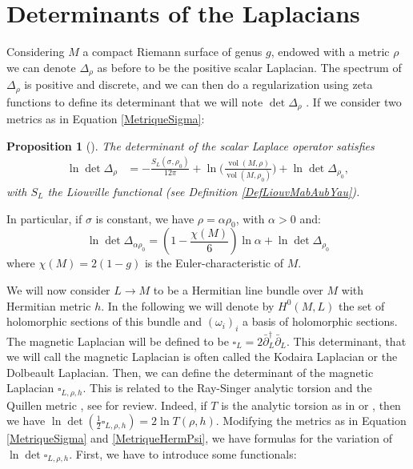 \documentclass{article}
\newtheorem{Proposition}[theorem]{Proposition}
\theoremstyle{definition}
\theoremstyle{remark}
\DeclareMathOperator{\vol}{vol}
\begin{document}
\section{Determinants of the Laplacians}\label{SectionDeterminantOftheLaplacians}
Considering $M$ a compact Riemann surface of genus $g$, endowed with a metric $\rho$ we can denote $\Delta_{\rho}$ as before to be the positive scalar Laplacian. The spectrum of $\Delta_{\rho}$ is positive and discrete, and we can then do a regularization using zeta functions to define its determinant that we will note $\det\Delta_{\rho}$ 
. If we consider two metrics as in Equation \eqref{MetriqueSigma}: 
\begin{Proposition}[{\cite[Equation (1.13)]{OSGOOD1988148}}]\label{VarDetSca}
    The determinant of the scalar Laplace operator satisfies  
    \begin{align*}
        \ln\det\Delta_{\rho}
        &=-\frac{S_{L}(\sigma,\rho_{0})}{12\pi}+\ln\bigg(\frac{\vol(M,\rho)}{\vol(M,\rho_{0})}\bigg)+\ln\det\Delta_{\rho_{0}},
         \end{align*}
         with $S_{L}$ the Liouville functional (see Definition \ref{DefLiouvMabAubYau}).
\end{Proposition}

In particular, if $\sigma$ is constant, we have $\rho=\alpha \rho_{0}$, with $\alpha>0$ and: 
\begin{equation}\label{VarDetLapScaCste}
    \ln\det \Delta_{\alpha \rho_{0}}=\left(1-\frac{\chi(M)}{6} \right)\ln \alpha+\ln\det\Delta_{\rho_{0}}
\end{equation}
where $\chi(M)=2(1-g)$ is the Euler-characteristic of $M.$

We will now consider $L \to M$ to be a Hermitian line bundle over $M$ with Hermitian metric $h.$ In the following we will denote by $H^{0}(M,L)$ the set of holomorphic sections of this bundle and $(\omega_{i})_{i}$ a basis of holomorphic sections. The magnetic Laplacian will be defined to be $\square_{L}=2\bar\partial^{\dagger}_{L}\bar{\partial}_{L}.$ This determinant, that we will call the magnetic Laplacian is often called the Kodaira Laplacian or the Dolbeault Laplacian.
Then, we can define the determinant of the magnetic Laplacian $\square_{L,\rho,h}$. This is related to the Ray-Singer analytic torsion \cite{RAY1971145} and the Quillen metric \cite{Quillen1985DeterminantsOC,BismutGilletSouleQuillenMetric}, see \cite{HolomorphicMorseMaMarinescu} for review. Indeed, if $T$ is the analytic torsion as in \cite{FINSKI20183457} or \cite{HolomorphicMorseMaMarinescu}, then we have $\ln\det\left(\frac{1}{2}\square_{L,\rho,h}\right)=2\ln T(\rho,h)$. Modifying the metrics as in Equation \eqref{MetriqueSigma} and \eqref{MetriqueHermPsi}, we have formulas for the variation of $\ln \det \square_{L,\rho,h}.$ First, we have to introduce some functionals: 
\end{document}
